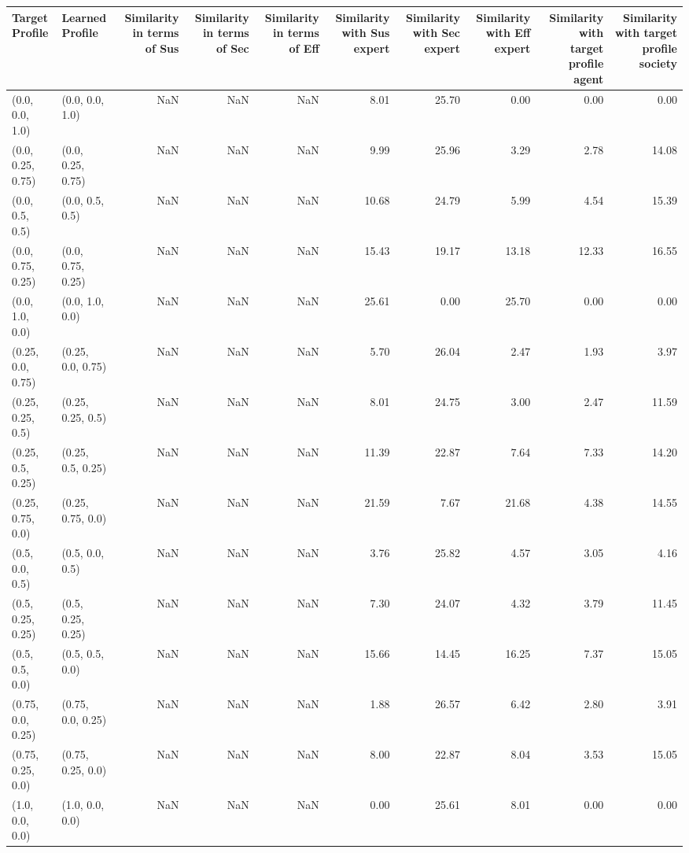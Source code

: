 \begin{tabular}{llrrrrrrrr}
\toprule
Target Profile & Learned Profile & Similarity in terms of Sus & Similarity in terms of Sec & Similarity in terms of Eff & Similarity with Sus expert & Similarity with Sec expert & Similarity with Eff expert & Similarity with target profile agent & Similarity with target profile society \\
\midrule
(0.0, 0.0, 1.0) & (0.0, 0.0, 1.0) & NaN & NaN & NaN & 8.01 & 25.70 & 0.00 & 0.00 & 0.00 \\
(0.0, 0.25, 0.75) & (0.0, 0.25, 0.75) & NaN & NaN & NaN & 9.99 & 25.96 & 3.29 & 2.78 & 14.08 \\
(0.0, 0.5, 0.5) & (0.0, 0.5, 0.5) & NaN & NaN & NaN & 10.68 & 24.79 & 5.99 & 4.54 & 15.39 \\
(0.0, 0.75, 0.25) & (0.0, 0.75, 0.25) & NaN & NaN & NaN & 15.43 & 19.17 & 13.18 & 12.33 & 16.55 \\
(0.0, 1.0, 0.0) & (0.0, 1.0, 0.0) & NaN & NaN & NaN & 25.61 & 0.00 & 25.70 & 0.00 & 0.00 \\
(0.25, 0.0, 0.75) & (0.25, 0.0, 0.75) & NaN & NaN & NaN & 5.70 & 26.04 & 2.47 & 1.93 & 3.97 \\
(0.25, 0.25, 0.5) & (0.25, 0.25, 0.5) & NaN & NaN & NaN & 8.01 & 24.75 & 3.00 & 2.47 & 11.59 \\
(0.25, 0.5, 0.25) & (0.25, 0.5, 0.25) & NaN & NaN & NaN & 11.39 & 22.87 & 7.64 & 7.33 & 14.20 \\
(0.25, 0.75, 0.0) & (0.25, 0.75, 0.0) & NaN & NaN & NaN & 21.59 & 7.67 & 21.68 & 4.38 & 14.55 \\
(0.5, 0.0, 0.5) & (0.5, 0.0, 0.5) & NaN & NaN & NaN & 3.76 & 25.82 & 4.57 & 3.05 & 4.16 \\
(0.5, 0.25, 0.25) & (0.5, 0.25, 0.25) & NaN & NaN & NaN & 7.30 & 24.07 & 4.32 & 3.79 & 11.45 \\
(0.5, 0.5, 0.0) & (0.5, 0.5, 0.0) & NaN & NaN & NaN & 15.66 & 14.45 & 16.25 & 7.37 & 15.05 \\
(0.75, 0.0, 0.25) & (0.75, 0.0, 0.25) & NaN & NaN & NaN & 1.88 & 26.57 & 6.42 & 2.80 & 3.91 \\
(0.75, 0.25, 0.0) & (0.75, 0.25, 0.0) & NaN & NaN & NaN & 8.00 & 22.87 & 8.04 & 3.53 & 15.05 \\
(1.0, 0.0, 0.0) & (1.0, 0.0, 0.0) & NaN & NaN & NaN & 0.00 & 25.61 & 8.01 & 0.00 & 0.00 \\
\bottomrule
\end{tabular}
